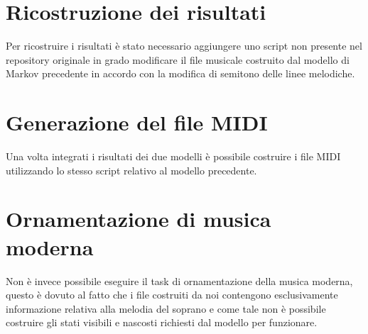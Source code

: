 \section{Ricostruzione dei risultati}
Per ricostruire i risultati è stato necessario aggiungere uno script non presente nel repository originale in grado modificare il file musicale costruito dal modello di Markov precedente in accordo con la modifica di semitono delle linee melodiche.
\section{Generazione del file MIDI}
Una volta integrati i risultati dei due modelli è possibile costruire i file MIDI utilizzando lo stesso script relativo al modello precedente.
\section{Ornamentazione di musica moderna}
Non è invece possibile eseguire il task di ornamentazione della musica moderna, questo è dovuto al fatto che i file costruiti da noi contengono esclusivamente informazione relativa alla melodia del soprano e come tale non è possibile costruire gli stati visibili e nascosti richiesti dal modello per funzionare.
  